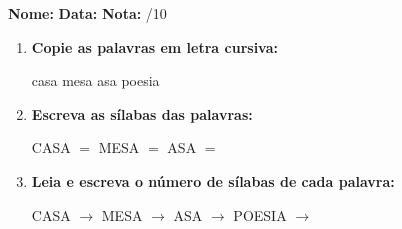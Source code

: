 \begin{exercicio}



\noindent\textbf{Nome:} \underline{\hspace{3.2cm}} \quad \textbf{Data:} \underline{\hspace{1.6cm}} \quad \textbf{Nota:} \underline{\hspace{0.9cm}}/10


\begin{enumerate}

  \item \textbf{Copie as palavras em letra cursiva:}
  \begin{center}
  casa \quad mesa \quad asa \quad poesia
  \end{center}
  \begin{center}
  \underline{\hspace{2.4cm}} \quad \underline{\hspace{2.4cm}} \quad \underline{\hspace{2.4cm}} \quad \underline{\hspace{2.4cm}}
  \end{center}

  \item \textbf{Escreva as sílabas das palavras:}
  \begin{center}
  CASA $=$ \underline{\hspace{1.5cm}} \underline{\hspace{1.5cm}} \quad MESA $=$ \underline{\hspace{1.5cm}} \underline{\hspace{1.5cm}} \quad ASA $=$ \underline{\hspace{1.5cm}} \underline{\hspace{1.5cm}}
  \end{center}

  \item \textbf{Leia e escreva o número de sílabas de cada palavra:}
  \begin{center}
  CASA $\rightarrow$ \underline{\hspace{0.9cm}} \quad MESA $\rightarrow$ \underline{\hspace{0.9cm}} \quad ASA $\rightarrow$ \underline{\hspace{0.9cm}} \quad POESIA $\rightarrow$ \underline{\hspace{0.9cm}}
  \end{center}


\end{enumerate}
\end{exercicio}
